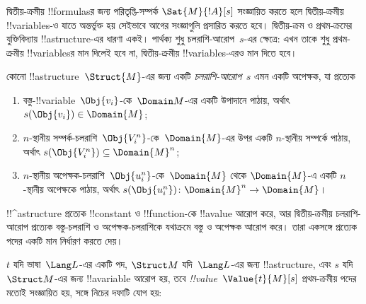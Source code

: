 \documentclass[../../../include/open-logic-section]{subfiles}
\begin{document}


\begin{explain}
দ্বিতীয়-ক্রমীয় !!{formula}sর জন্য পরিতৃপ্তি-সম্পর্ক
$\Sat{M}{!A}[s]$ সংজ্ঞায়িত করতে হলে দ্বিতীয়-ক্রমীয় !!{variable}s-ও
যাতে অন্তর্ভুক্ত হয় সেইভাবে আগের সংজ্ঞাগুলি প্রসারিত করতে হবে।
দ্বিতীয়-ক্রম ও প্রথম-ক্রমের যুক্তিবিদ্যায় !!a{structure}-এর ধারণা একই।
পার্থক্য শুধু চলরাশি-আরোপ~$s$-এর ক্ষেত্রে: এখন তাকে শুধু প্রথম-ক্রমীয়
!!{variable}sর মান দিলেই হবে না, দ্বিতীয়-ক্রমীয় !!{variable}s-এরও
মান দিতে হবে।
\end{explain}

\begin{defn}[চলরাশি-আরোপ]
কোনো !!a{structure}~$\Struct{M}$-এর জন্য একটি \emph{চলরাশি-আরোপ}~$s$
এমন একটি অপেক্ষক, যা প্রত্যেক
\begin{enumerate}
\item বস্তু-!!{variable}~$\Obj{v_i}$-কে~$\Domain M$-এর একটি উপাদানে
  পাঠায়, অর্থাৎ $s(\Obj{v_i}) \in \Domain{M}$;
\item $n$-স্থানীয় সম্পর্ক-চলরাশি~$\Obj{V_i^n}$-কে~$\Domain{M}$-এর উপর
  একটি $n$-স্থানীয় সম্পর্কে পাঠায়, অর্থাৎ $s(\Obj{V_i^n}) \subseteq
  \Domain{M}^n$;
\item $n$-স্থানীয় অপেক্ষক-চলরাশি~$\Obj{u_i^n}$-কে~$\Domain{M}$ থেকে
  $\Domain{M}$-এ একটি $n$-স্থানীয় অপেক্ষকে পাঠায়, অর্থাৎ
  $s(\Obj{u_i^n})\colon \Domain{M}^n \to \Domain{M}$।
\end{enumerate}
\end{defn}

\begin{explain}
!!^a{structure} প্রত্যেক !!{constant} ও !!{function}-কে !!a{value}
আরোপ করে, আর দ্বিতীয়-ক্রমীয় চলরাশি-আরোপ প্রত্যেক বস্তু-চলরাশি ও
অপেক্ষক-চলরাশিকে যথাক্রমে বস্তু ও অপেক্ষক আরোপ করে। তারা একসঙ্গে
প্রত্যেক পদের একটি মান নির্ধারণ করতে দেয়।
\end{explain}

\begin{defn}
$t$ যদি ভাষা~$\Lang L$-এর একটি পদ, $\Struct M$ যদি~$\Lang L$-এর জন্য
!!a{structure}, এবং $s$ যদি~$\Struct M$-এর জন্য !!a{variable}
আরোপ হয়, তবে \emph{!!{value}}~$\Value{t}{M}[s]$ প্রথম-ক্রমীয়
পদের মতোই সংজ্ঞায়িত হয়, সঙ্গে নিচের দফাটি যোগ হয়:
\begin{quote}
\end{quote}
\end{defn}
\end{document}
